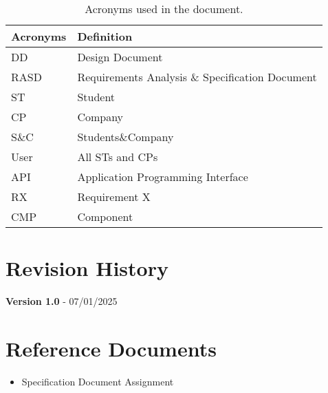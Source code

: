 \begin{table}[H]
    \begin{center}
        \begin{tabular}{ |l|l| }
            \hline
            \textbf{Acronyms} & \textbf{Definition}                              \\
            \hline
            DD             & Design Document                      \\
            \hline            
            RASD             & Requirements Analysis \& Specification Document     \\   
            \hline
            ST              & Student                         \\
            \hline
            CP              & Company                         \\
            \hline
            S\&C             & Students\&Company                   \\
            \hline
            User            & All STs and CPs                           \\
            \hline
            API             & Application Programming Interface       \\
            \hline
            RX              & Requirement X                           \\
            \hline
            CMP            & Component                           \\
            \hline
         \end{tabular}
        \caption{Acronyms used in the document.}
        \label{tab:acronyms}%
    \end{center}
\end{table}

\section{Revision History}
\label{sec:revision_history}%
\textbf{Version 1.0} - 07/01/2025

\section{Reference Documents}
\label{sec:reference_documents}%

\begin{itemize}
    \item Specification Document Assignment
\end{itemize}

